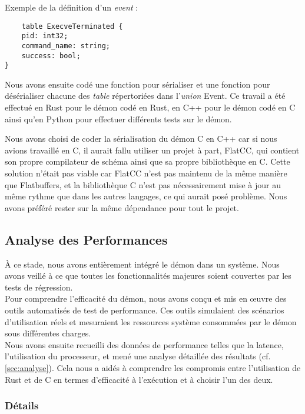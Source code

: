 \documentclass{article}
\begin{document}
\noindent Exemple de la définition d'un \textit{event} : 

\begin{verbatim}
    table ExecveTerminated {
    pid: int32;
    command_name: string;
    success: bool;
}
\end{verbatim}

Nous avons ensuite codé une fonction pour sérialiser et une fonction pour désérialiser chacune des \textit{table} répertoriées dans l'\textit{union} Event. Ce travail a été effectué en Rust pour le démon codé en Rust, en C++ pour le démon codé en C ainsi qu'en Python pour effectuer différents tests sur le démon. 

Nous avons choisi de coder la sérialisation du démon C en C++ car si nous avions travaillé en C, il aurait fallu utiliser un projet à part, FlatCC, qui contient son propre compilateur de schéma ainsi que sa propre bibliothèque en C. Cette solution n'était pas viable car FlatCC n'est pas maintenu de la même manière que Flatbuffers, et la bibliothèque C n'est pas nécessairement mise à jour au même rythme que dans les autres langages, ce qui aurait posé problème. Nous avons préféré rester sur la même dépendance pour tout le projet.

\subsection{Analyse des Performances}

À ce stade, nous avons entièrement intégré le démon dans un système. Nous avons veillé à ce que toutes les fonctionnalités majeures soient couvertes par les tests de régression.\\

Pour comprendre l’efficacité du démon, nous avons conçu et mis en œuvre des outils automatisés de test de performance. Ces outils simulaient des scénarios d’utilisation réels et mesuraient les ressources système consommées par le démon sous différentes charges.\\

Nous avons ensuite recueilli des données de performance telles que la latence, l’utilisation du processeur, et mené une analyse détaillée des résultats (cf. \ref{sec:analyse}). Cela nous a aidés à comprendre les compromis entre l'utilisation de Rust et de C en termes d’efficacité à l'exécution et à choisir l’un des deux.

\subsubsection{Détails}
\end{document}
